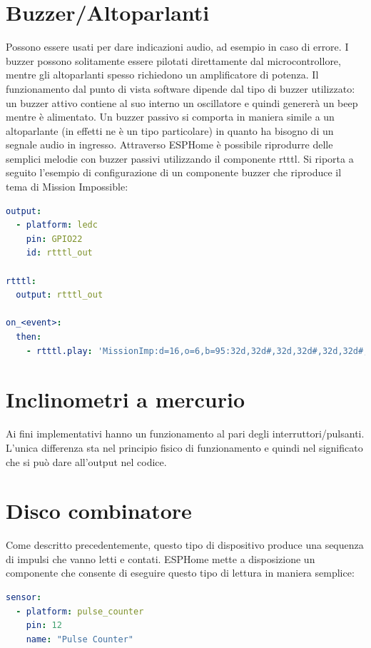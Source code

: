 \documentclass[12pt,a4paper]{report}
\begin{document}
\section{Buzzer/Altoparlanti}
Possono essere usati per dare indicazioni audio, ad esempio in caso di errore. I buzzer possono solitamente essere pilotati direttamente
dal microcontrollore, mentre gli altoparlanti spesso richiedono un amplificatore di potenza.
Il funzionamento dal punto di vista software dipende dal tipo di buzzer utilizzato: un buzzer attivo contiene al suo interno un oscillatore
e quindi genererà un beep mentre è alimentato. Un buzzer passivo si comporta in maniera simile a un altoparlante (in effetti ne è un tipo
particolare) in quanto ha bisogno di un segnale audio in ingresso.
Attraverso ESPHome è possibile riprodurre delle semplici melodie con buzzer passivi utilizzando il componente rtttl. Si riporta a seguito
l'esempio di configurazione di un componente buzzer che riproduce il tema di Mission Impossible\cite{esphomeio}:
\begin{lstlisting}[language=yaml]
output:
  - platform: ledc
    pin: GPIO22
    id: rtttl_out

rtttl:
  output: rtttl_out

on_<event>:
  then:
    - rtttl.play: 'MissionImp:d=16,o=6,b=95:32d,32d#,32d,32d#,32d,32d#,32d,32d#,32d,32d,32d#,32e,32f,32f#,32g,g,8p,g,8p,a#,p,c7,p,g,8p,g,8p,f,p,f#,p,g,8p,g,8p,a#,p,c7,p,g,8p,g,8p,f,p,f#,p,a#,g,2d,32p,a#,g,2c#,32p,a#,g,2c,a#5,8c,2p,32p,a#5,g5,2f#,32p,a#5,g5,2f,32p,a#5,g5,2e,d#,8d'
\end{lstlisting}
\section{Inclinometri a mercurio}
Ai fini implementativi hanno un funzionamento al pari degli interruttori/pulsanti. L'unica differenza sta nel principio fisico di funzionamento
e quindi nel significato che si può dare all'output nel codice.

\section{Disco combinatore}
Come descritto precedentemente, questo tipo di dispositivo produce una sequenza di impulsi che vanno letti e contati. ESPHome mette
a disposizione un componente che consente di eseguire questo tipo di lettura in maniera semplice:
\begin{lstlisting}[language=yaml]
sensor:
  - platform: pulse_counter
    pin: 12
    name: "Pulse Counter"
\end{lstlisting}
\end{document}

